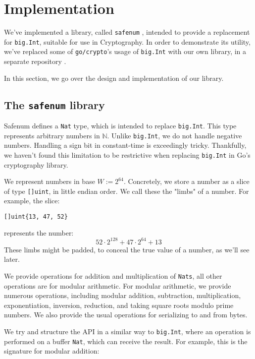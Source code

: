 \documentclass[11pt, a4paper]{article} %
\begin{document}
{\section{Implementation}

We've implemented a library, called
\texttt{safenum} \cite{meier_cronokirbysafenum_2021}, intended to provide
a replacement for \texttt{big.Int}, suitable for use in Cryptography.
In order to demonstrate its utility, we've replaced some
of \texttt{go/crypto}'s usage of \texttt{big.Int} with our own library,
in a separate repository
\cite{meier_cronokirbyctcrypto_2021}.

In this section, we go over the design and implementation of our
library.

\subsection{The \texttt{safenum} library}

Safenum defines a \texttt{Nat} type, which is intended to
replace \texttt{big.Int}. This type represents arbitrary
numbers in $\mathbb{N}$. Unlike \texttt{big.Int}, we do not handle
negative numbers. Handling a sign bit in constant-time is exceedingly
tricky. Thankfully, we haven't found this limitation to be restrictive
when replacing \texttt{big.Int} in Go's cryptography library.

We represent numbers in base $W := 2^{64}$. Concretely, we
store a number as a slice of type \texttt{[]uint}, in little
endian order. We call these the "limbs" of a number. For example,
the slice:
\begin{verbatim}
[]uint{13, 47, 52}
\end{verbatim}
represents the number:
$$
52 \cdot 2^{128} + 47 \cdot 2^{64} + 13
$$
These limbs might be padded, to conceal the true value of a number,
as we'll see later.

We provide operations for addition and multiplication of \texttt{Nats},
all other operations are for modular arithmetic. For modular arithmetic,
we provide numerous operations, including modular addition, subtraction,
multiplication, exponentiation, inversion, reduction, and taking
square roots modulo prime numbers. We also provide the usual operations
for serializing to and from bytes.

We try and structure the API in a similar way to \texttt{big.Int},
where an operation is performed on a buffer \texttt{Nat}, which
can receive the result. For example, this is the signature for
modular addition:

}
\end{document}
